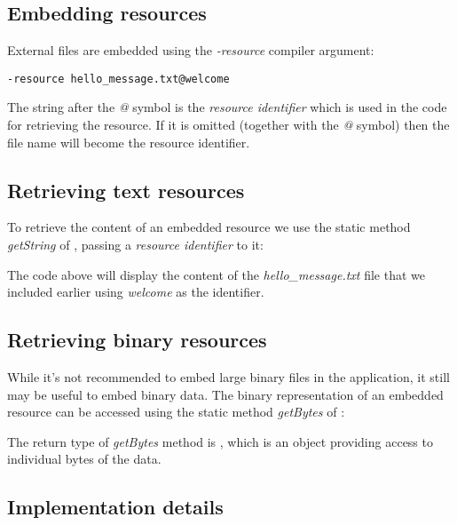\subsection{Embedding resources}
\label{cr-resources-embed}

External files are embedded using the \emph{-resource} compiler argument:

\begin{lstlisting}
-resource hello_message.txt@welcome
\end{lstlisting}

The string after the \emph{@} symbol is the \emph{resource identifier} which is used in the code for retrieving the resource. If it is omitted (together with the \emph{@} symbol) then the file name will become the resource identifier.

\subsection{Retrieving text resources}
\label{cr-resources-getString}

To retrieve the content of an embedded resource we use the static method \emph{getString} of , passing a \emph{resource identifier} to it:


The code above will display the content of the \emph{hello_message.txt} file that we included earlier using \emph{welcome} as the identifier.

\subsection{Retrieving binary resources}
\label{cr-resources-getBytes}

While it's not recommended to embed large binary files in the application, it still may be useful to embed binary data. The binary representation of an embedded resource can be accessed using the static method \emph{getBytes} of :


The return type of \emph{getBytes} method is , which is an object providing access to individual bytes of the data.

\subsection{Implementation details}
\label{cr-resources-impl}

